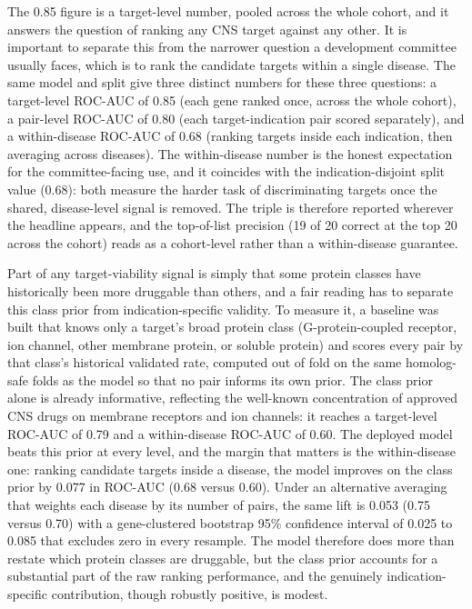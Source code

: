 \documentclass[11pt,twocolumn]{article}
\begin{document}
The 0.85 figure is a target-level number, pooled across the whole cohort, and it answers the question of ranking any CNS target against any other. It is important to separate this from the narrower question a development committee usually faces, which is to rank the candidate targets within a single disease. The same model and split give three distinct numbers for these three questions: a target-level ROC-AUC of 0.85 (each gene ranked once, across the whole cohort), a pair-level ROC-AUC of 0.80 (each target-indication pair scored separately), and a within-disease ROC-AUC of 0.68 (ranking targets inside each indication, then averaging across diseases). The within-disease number is the honest expectation for the committee-facing use, and it coincides with the indication-disjoint split value (0.68): both measure the harder task of discriminating targets once the shared, disease-level signal is removed. The triple is therefore reported wherever the headline appears, and the top-of-list precision (19 of 20 correct at the top 20 across the cohort) reads as a cohort-level rather than a within-disease guarantee.

Part of any target-viability signal is simply that some protein classes have historically been more druggable than others, and a fair reading has to separate this class prior from indication-specific validity. To measure it, a baseline was built that knows only a target's broad protein class (G-protein-coupled receptor, ion channel, other membrane protein, or soluble protein) and scores every pair by that class's historical validated rate, computed out of fold on the same homolog-safe folds as the model so that no pair informs its own prior. The class prior alone is already informative, reflecting the well-known concentration of approved CNS drugs on membrane receptors and ion channels: it reaches a target-level ROC-AUC of 0.79 and a within-disease ROC-AUC of 0.60. The deployed model beats this prior at every level, and the margin that matters is the within-disease one: ranking candidate targets inside a disease, the model improves on the class prior by 0.077 in ROC-AUC (0.68 versus 0.60). Under an alternative averaging that weights each disease by its number of pairs, the same lift is 0.053 (0.75 versus 0.70) with a gene-clustered bootstrap 95\% confidence interval of 0.025 to 0.085 that excludes zero in every resample. The model therefore does more than restate which protein classes are druggable, but the class prior accounts for a substantial part of the raw ranking performance, and the genuinely indication-specific contribution, though robustly positive, is modest.
\end{document}

